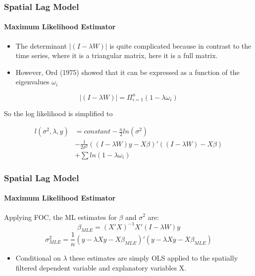 \documentclass[
  shownotes,
  xcolor={svgnames},
  hyperref={colorlinks,citecolor=DarkBlue,linkcolor=DarkRed,urlcolor=DarkBlue}
  ]{beamer}
\begin{document}
\begin{frame}[fragile]
\frametitle{Spatial Lag Model}
\framesubtitle{Maximum Likelihood Estimator}

\begin{itemize}
\item The determinant $|(I-\lambda W)|$ is quite complicated because in contrast to the time series, where it is a triangular matrix, here it is a full matrix. 
\item However, Ord (1975) showed that it can be expressed as a function of the eigenvalues $\omega_{i}$
\end{itemize}


\[
|(I-\lambda W)|=\Pi_{i=1}^{n}(1-\lambda\omega_{i})
\]

So the log likelihood is simplified to 

\begin{align}
l\left(\sigma^{2},\lambda,y\right)&=constant-\frac{n}{2}ln\left(\sigma^{2}\right) \nonumber \\
&-\frac{1}{2\sigma^{2}}((I-\lambda W)y-X\beta)'((I-\lambda W)-X\beta) \nonumber \\
&+\sum ln(1-\lambda\omega_{i})
\end{align}

\end{frame}
\begin{frame}[fragile]
\frametitle{Spatial Lag Model}
\framesubtitle{Maximum Likelihood Estimator}

Applying  FOC, the ML estimates for $\beta$ and $\sigma^{2}$ are:
\bigskip
\[
\beta_{MLE}=(X'X)^{-1}X'(I-\lambda W)y
\]
\bigskip
\[
\sigma_{MLE}^{2}=\frac{1}{n}(y-\lambda Xy-X\beta_{MLE})'(y-\lambda Xy-X\beta_{MLE})
\]

\bigskip
\begin{itemize}
\item Conditional on $\lambda$ these estimates are simply OLS applied to the spatially filtered dependent variable and explanatory variables X.
\end{itemize}


\end{frame}
\end{document}
